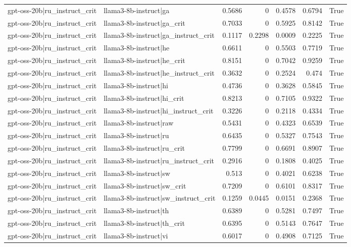 \begin{table}
\begin{tabular}{l l r r r r l}
gpt-oss-20b|ru_instruct_crit & llama3-8b-instruct|ga & 0.5686 & 0 & 0.4578 & 0.6794 & True \\
gpt-oss-20b|ru_instruct_crit & llama3-8b-instruct|ga_crit & 0.7033 & 0 & 0.5925 & 0.8142 & True \\
gpt-oss-20b|ru_instruct_crit & llama3-8b-instruct|ga_instruct_crit & 0.1117 & 0.2298 & 0.0009 & 0.2225 & True \\
gpt-oss-20b|ru_instruct_crit & llama3-8b-instruct|he & 0.6611 & 0 & 0.5503 & 0.7719 & True \\
gpt-oss-20b|ru_instruct_crit & llama3-8b-instruct|he_crit & 0.8151 & 0 & 0.7042 & 0.9259 & True \\
gpt-oss-20b|ru_instruct_crit & llama3-8b-instruct|he_instruct_crit & 0.3632 & 0 & 0.2524 & 0.474 & True \\
gpt-oss-20b|ru_instruct_crit & llama3-8b-instruct|hi & 0.4736 & 0 & 0.3628 & 0.5845 & True \\
gpt-oss-20b|ru_instruct_crit & llama3-8b-instruct|hi_crit & 0.8213 & 0 & 0.7105 & 0.9322 & True \\
gpt-oss-20b|ru_instruct_crit & llama3-8b-instruct|hi_instruct_crit & 0.3226 & 0 & 0.2118 & 0.4334 & True \\
gpt-oss-20b|ru_instruct_crit & llama3-8b-instruct|raw & 0.5431 & 0 & 0.4323 & 0.6539 & True \\
gpt-oss-20b|ru_instruct_crit & llama3-8b-instruct|ru & 0.6435 & 0 & 0.5327 & 0.7543 & True \\
gpt-oss-20b|ru_instruct_crit & llama3-8b-instruct|ru_crit & 0.7799 & 0 & 0.6691 & 0.8907 & True \\
gpt-oss-20b|ru_instruct_crit & llama3-8b-instruct|ru_instruct_crit & 0.2916 & 0 & 0.1808 & 0.4025 & True \\
gpt-oss-20b|ru_instruct_crit & llama3-8b-instruct|sw & 0.513 & 0 & 0.4021 & 0.6238 & True \\
gpt-oss-20b|ru_instruct_crit & llama3-8b-instruct|sw_crit & 0.7209 & 0 & 0.6101 & 0.8317 & True \\
gpt-oss-20b|ru_instruct_crit & llama3-8b-instruct|sw_instruct_crit & 0.1259 & 0.0445 & 0.0151 & 0.2368 & True \\
gpt-oss-20b|ru_instruct_crit & llama3-8b-instruct|th & 0.6389 & 0 & 0.5281 & 0.7497 & True \\
gpt-oss-20b|ru_instruct_crit & llama3-8b-instruct|th_crit & 0.6395 & 0 & 0.5143 & 0.7647 & True \\
gpt-oss-20b|ru_instruct_crit & llama3-8b-instruct|vi & 0.6017 & 0 & 0.4908 & 0.7125 & True \\

\end{tabular}
\end{table}
